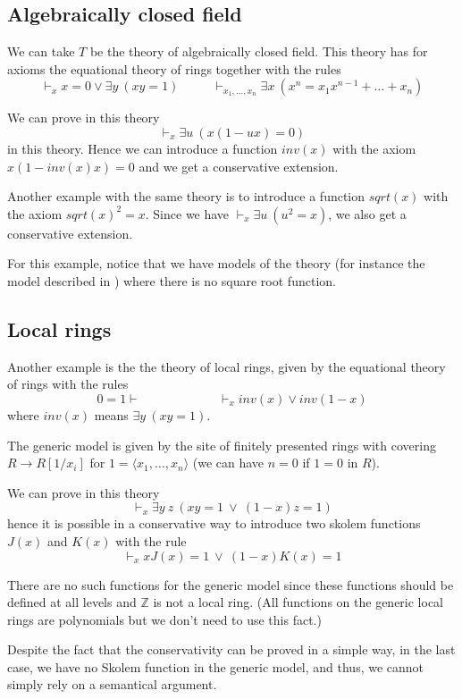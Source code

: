 \documentclass[10pt,a4paper]{article}
\newcommand{\ideal}[1]{\langle #1\rangle}
\newcommand{\ints}{\mathbb{Z}}
\begin{document}
\subsection{Algebraically closed field}

 We can take $T$ be the theory of algebraically closed field. This theory
has for axioms the equational theory of rings together with the rules
$$
\vdash_x x = 0 \vee \exists y~(xy = 1)~~~~~~~~~~~~
\vdash_{x_1,\dots,x_n} \exists x~(x^n = x_1 x^{n-1} + \dots + x_n)
$$

 We can prove in this theory
$$
\vdash_{x} \exists u~ (x(1-ux) = 0)
$$
in this theory. Hence we can introduce a function $inv(x)$ with the axiom
$x(1 -inv(x) x) = 0$ and we get a conservative extension. 

 Another example with the same theory is to introduce a function $sqrt(x)$ with the axiom
$sqrt(x)^2 = x$. Since we have $\vdash_{x} \exists u~(u^2 = x)$, we also get a conservative
extension.

 For this example, notice that we have models of the theory (for instance the model described
in \cite{Mannaa}) where there is no square root function.

\subsection{Local rings}

 Another example is the the theory of local rings, given by the equational theory of rings
with the rules
$$
0=1\vdash~~~~~~~~~~~~~~~~~~~~~~~~~~~~\vdash_x inv(x)\vee inv(1-x)
$$
where $inv(x)$ means $\exists y~(xy = 1)$. 

 The generic model is given by the site of finitely presented rings with covering
$R\rightarrow R[1/x_i]$ for $1 = \ideal{x_1,\dots,x_n}$ (we can have $n = 0$ if $1=0$ in $R$).

 We can prove in this theory
$$
\vdash_x \exists y~z~(x y = 1~\vee ~(1-x) z = 1)
$$
hence it is possible in a conservative way
to introduce two skolem functions $J(x)$ and $K(x)$ with the rule
$$
\vdash_x xJ(x) = 1~\vee~(1-x)K(x) = 1
$$

 There are no such functions for the generic model since these functions should be defined
at all levels and $\ints$ is not a local ring.
(All functions on the generic local rings are polynomials but we don't need to use this fact.)

\medskip

 Despite the fact that the conservativity can be proved in a simple way, in the last case, we
have no Skolem function in the generic model, and thus, we cannot simply rely on a semantical
argument.
\end{document}
